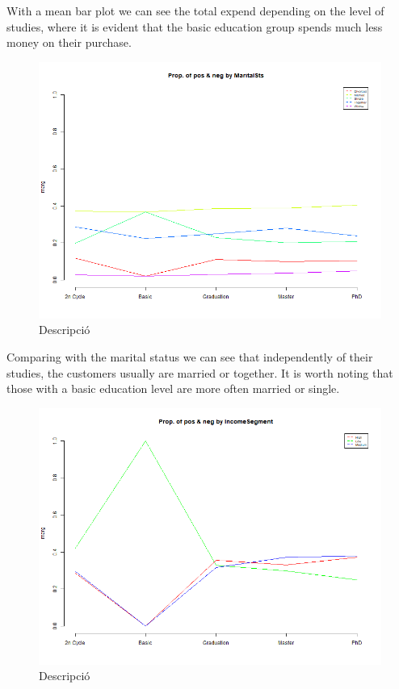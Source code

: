 With a mean bar plot we can see the total expend depending on the level of studies, where it is evident that the basic education group spends much less money on their purchase.

\begin{figure}[H]
    \centering
    \includegraphics[width= 1\linewidth]{Imatges/prop_cond_class_MaritalSts_4_legend.png}
    \caption{Descripció}
    \label{fig:scree_plot_2} %
\end{figure}

Comparing with the marital status we can see that independently of their studies, the customers usually are married or together. It is worth noting that those with a basic education level are more often married or single.
\begin{figure}[H]
    \centering
    \includegraphics[width= 1\linewidth]{Imatges/prop_cond_class_IncomeSegment_4_legend.png}
    \caption{Descripció}
    \label{fig:scree_plot_3} %
\end{figure}


